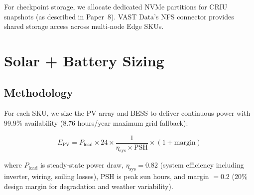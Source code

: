 \documentclass[conference,10pt,letterpaper]{IEEEtran}
\begin{document}
For checkpoint storage, we allocate dedicated NVMe partitions for CRIU snapshots (as described in Paper~8). VAST Data's NFS connector provides shared storage access across multi-node Edge SKUs.

\section{Solar + Battery Sizing}
\label{sec:sizing}

\subsection{Methodology}

For each SKU, we size the PV array and BESS to deliver continuous power with 99.9\% availability (8.76 hours/year maximum grid fallback):

\begin{equation}
E_{\text{PV}} = P_{\text{load}} \times 24 \times \frac{1}{\eta_{\text{sys}} \times \text{PSH}} \times (1 + \text{margin})
\end{equation}

where $P_{\text{load}}$ is steady-state power draw, $\eta_{\text{sys}} = 0.82$ (system efficiency including inverter, wiring, soiling losses), PSH is peak sun hours, and margin $= 0.2$ (20\% design margin for degradation and weather variability).

\begin{table}[!t]
\caption{Solar + Battery Sizing by SKU}
\label{tab:sizing}
\centering\scriptsize
{}
\end{table}
\end{document}
